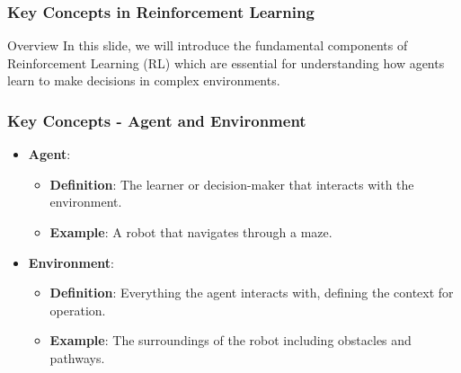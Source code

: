 \documentclass{beamer}
\begin{document}
\begin{frame}[fragile]
    \frametitle{Key Concepts in Reinforcement Learning}
    \begin{block}{Overview}
        In this slide, we will introduce the fundamental components of Reinforcement Learning (RL) which are essential for understanding how agents learn to make decisions in complex environments.
    \end{block}
\end{frame}

\begin{frame}[fragile]
    \frametitle{Key Concepts - Agent and Environment}
    
    \begin{itemize}
        \item \textbf{Agent}:
            \begin{itemize}
                \item \textbf{Definition}: The learner or decision-maker that interacts with the environment.
                \item \textbf{Example}: A robot that navigates through a maze.
            \end{itemize}
        \item \textbf{Environment}:
            \begin{itemize}
                \item \textbf{Definition}: Everything the agent interacts with, defining the context for operation.
                \item \textbf{Example}: The surroundings of the robot including obstacles and pathways.
            \end{itemize}
    \end{itemize}
\end{frame}
\end{document}
